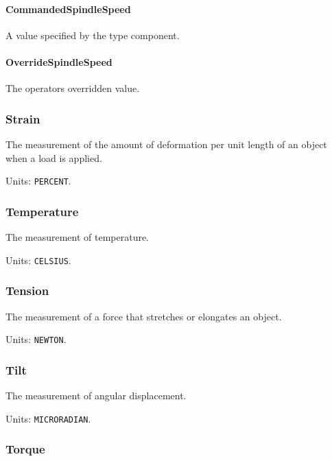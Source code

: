 \paragraph{CommandedSpindleSpeed}\mbox{}
\label{sec:CommandedSpindleSpeed}


A value specified by the  type component.


\paragraph{OverrideSpindleSpeed}\mbox{}
\label{sec:OverrideSpindleSpeed}


The operators overridden value.


\subsubsection{Strain}
\label{sec:Strain}



The measurement of the amount of deformation per unit length of an object when a load is applied.


Units: \texttt{PERCENT}.

\subsubsection{Temperature}
\label{sec:Temperature}



The measurement of temperature.


Units: \texttt{CELSIUS}.

\subsubsection{Tension}
\label{sec:Tension}



The measurement of a force that stretches or elongates an object.


Units: \texttt{NEWTON}.

\subsubsection{Tilt}
\label{sec:Tilt}



The measurement of angular displacement.


Units: \texttt{MICRO\textunderscore RADIAN}.

\subsubsection{Torque}
\label{sec:Torque}




